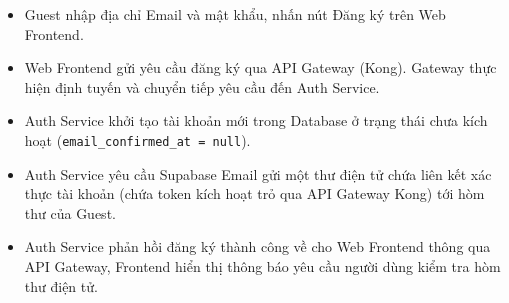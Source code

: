 \begin{itemize}
\item Guest nhập địa chỉ Email và mật khẩu, nhấn nút Đăng ký trên Web Frontend.
\item Web Frontend gửi yêu cầu đăng ký qua API Gateway (Kong). Gateway thực hiện định tuyến và chuyển tiếp yêu cầu đến Auth Service.
\item Auth Service khởi tạo tài khoản mới trong Database ở trạng thái chưa kích hoạt (\texttt{email\_confirmed\_at = null}).
\item Auth Service yêu cầu Supabase Email gửi một thư điện tử chứa liên kết xác thực tài khoản (chứa token kích hoạt trỏ qua API Gateway Kong) tới hòm thư của Guest.
\item Auth Service phản hồi đăng ký thành công về cho Web Frontend thông qua API Gateway, Frontend hiển thị thông báo yêu cầu người dùng kiểm tra hòm thư điện tử.
\end{itemize}
